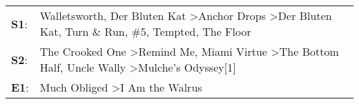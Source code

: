\begin{supertabular}{p{0.03\textwidth}p{0.92\textwidth}}
 \textbf{S1}:  &  Walletsworth\textsuperscript{}, \enspace Der Bluten Kat\textsuperscript{} \textgreater \enspace Anchor Drops\textsuperscript{} \textgreater \enspace Der Bluten Kat\textsuperscript{}, \enspace Turn \& Run\textsuperscript{}, \enspace \#5\textsuperscript{}, \enspace Tempted\textsuperscript{}, \enspace The Floor\textsuperscript{}  \enspace  \\
 \textbf{S2}:  &                                                 The Crooked One\textsuperscript{} \textgreater \enspace Remind Me\textsuperscript{}, \enspace Miami Virtue\textsuperscript{} \textgreater \enspace The Bottom Half\textsuperscript{}, \enspace Uncle Wally\textsuperscript{} \textgreater \enspace Mulche's Odyssey[1]\textsuperscript{}  \enspace  \\
 \textbf{E1}:  &                                                                                                                                                                                                                                                   Much Obliged\textsuperscript{} \textgreater \enspace I Am the Walrus\textsuperscript{}  \enspace  \\
\end{supertabular}
